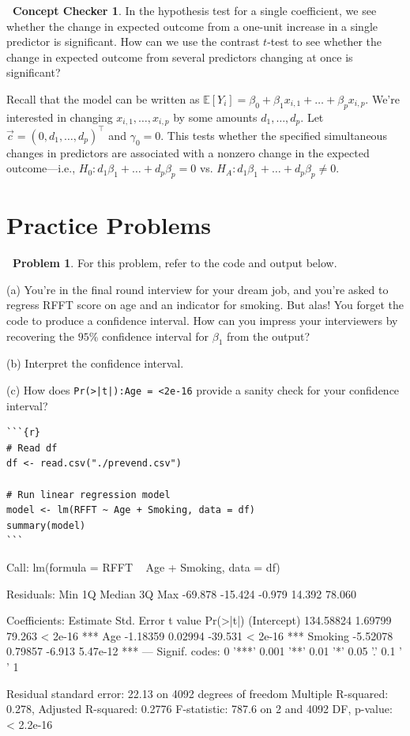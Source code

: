 \documentclass[12pt,oneside]{article}
\newcommand{\E}{\mathbb{E}}
\theoremstyle{definition}
\newtheorem{problem}{\faPen \ Problem}
\newtheorem{concept}{\faPen \ Concept Checker}
\theoremstyle{remark}
\begin{document}
\begin{concept}
In the hypothesis test for a single coefficient, we see whether the change in expected outcome from a one-unit increase in a single predictor is significant. How can we use the contrast $t$-test to see whether the change in expected outcome from several predictors changing at once is significant? 
\end{concept}

\begin{solutionbox}
Recall that the model can be written as $\E[Y_i] = \beta_0 + \beta_1 x_{i, 1} + \ldots + \beta_p x_{i, p}$. We're interested in changing $x_{i, 1}, \ldots, x_{i, p}$ by some amounts $d_1, \ldots, d_p$. Let $\vec{c} = (0, d_1, \ldots, d_p)^{\top}$ and $\gamma_0 = 0$. This tests whether the specified simultaneous changes in predictors are associated with a nonzero change in the expected outcome—i.e., $H_0: d_1 \beta_1 + \ldots + d_p \beta_p = 0$ vs. $H_A: d_1 \beta_1 + \ldots + d_p \beta_p \neq 0$.
\end{solutionbox}

\section{Practice Problems}

\begin{problem}
For this problem, refer to the code and output below.

(a) You're in the final round interview for your dream job, and you're asked to regress RFFT score on age and an indicator for smoking. But alas! You forget the code to produce a confidence interval. How can you impress your interviewers by recovering the $95\%$ confidence interval for $\beta_1$ from the output?

(b) Interpret the confidence interval.

(c) How does \texttt{Pr(>|t|):Age = <2e-16} provide a sanity check for your confidence interval?
\end{problem}

\begin{lstlisting}
```{r}
# Read df
df <- read.csv("./prevend.csv")

# Run linear regression model
model <- lm(RFFT ~ Age + Smoking, data = df)
summary(model)
```
\end{lstlisting}

\begin{routput}
Call:
lm(formula = RFFT ~ Age + Smoking, data = df)

Residuals:
    Min      1Q  Median      3Q     Max 
-69.878 -15.424  -0.979  14.392  78.060 

Coefficients:
             Estimate Std. Error t value Pr(>|t|)    
(Intercept) 134.58824    1.69799  79.263  < 2e-16 ***
Age          -1.18359    0.02994 -39.531  < 2e-16 ***
Smoking      -5.52078    0.79857  -6.913 5.47e-12 ***
---
Signif. codes:  0 '***' 0.001 '**' 0.01 '*' 0.05 '.' 0.1 ' ' 1

Residual standard error: 22.13 on 4092 degrees of freedom
Multiple R-squared:  0.278,	Adjusted R-squared:  0.2776 
F-statistic: 787.6 on 2 and 4092 DF,  p-value: < 2.2e-16
\end{routput}
\end{document}
